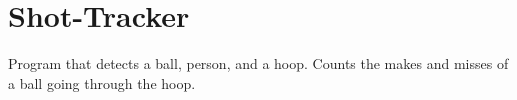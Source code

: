 \chapter{Shot-\/\+Tracker}
\hypertarget{md__r_e_a_d_m_e}{}\label{md__r_e_a_d_m_e}
\label{md__r_e_a_d_m_e_autotoc_md0}%
%


Program that detects a ball, person, and a hoop. Counts the makes and misses of a ball going through the hoop. 
